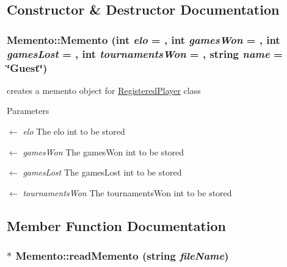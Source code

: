 \subsection{Constructor \& Destructor Documentation}
\hypertarget{classMemento_a00be4fd2d6ba40b9c7e212a64a834f81}{
\subsubsection[{Memento}]{\setlength{\rightskip}{0pt plus 5cm}Memento::Memento (int {\em elo} = {}, \/  int {\em gamesWon} = {}, \/  int {\em gamesLost} = {}, \/  int {\em tournamentsWon} = {}, \/  string {\em name} = {\ttfamily \char`\"{}Guest\char`\"{}})}}
\label{classMemento_a00be4fd2d6ba40b9c7e212a64a834f81}


creates a memento object for \hyperlink{classRegisteredPlayer}{RegisteredPlayer} class 
\begin{DoxyParams}{Parameters}
\item[\mbox{$\leftarrow$} {\em elo}]The elo int to be stored \item[\mbox{$\leftarrow$} {\em gamesWon}]The gamesWon int to be stored \item[\mbox{$\leftarrow$} {\em gamesLost}]The gamesLost int to be stored \item[\mbox{$\leftarrow$} {\em tournamentsWon}]The tournamentsWon int to be stored \end{DoxyParams}


\subsection{Member Function Documentation}
\hypertarget{classMemento_ad159304bd2710dc9dc9c2ed523075dd0}{
\subsubsection[{readMemento}]{ $\ast$ Memento::readMemento (string {\em fileName})}}
\label{classMemento_ad159304bd2710dc9dc9c2ed523075dd0}



